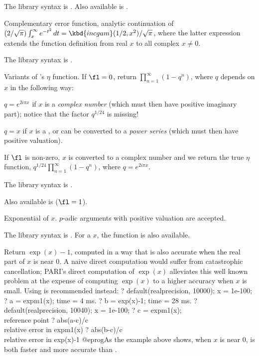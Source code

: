 The library syntax is .
Also available is .

\label{se:erfc}
Complementary error function, analytic continuation of
$(2/\sqrt\pi)\int_x^\infty e^{-t^2}\,dt = \kbd{incgam}(1/2,x^2)/\sqrt\pi$,
where the latter expression extends the function definition from real $x$ to
all complex $x \neq 0$.

The library syntax is .

\label{se:eta}
Variants of 's $\eta$ function.
If $\fl = 0$, return $\prod_{n=1}^\infty(1-q^n)$, where $q$ depends on $x$
in the following way:

\item $q = e^{2i\pi x}$ if $x$ is a \emph{complex number} (which must then
have positive imaginary part); notice that the factor $q^{1/24}$ is
missing!

\item $q = x$ if $x$ is a , or can be converted to a
\emph{power series} (which must then have positive valuation).

If $\fl$ is non-zero, $x$ is converted to a complex number and we return the
true $\eta$ function, $q^{1/24}\prod_{n=1}^\infty(1-q^n)$,
where $q = e^{2i\pi x}$.

The library syntax is .

Also available is  ($\fl=1$).

\label{se:exp}
Exponential of $x$.
$p$-adic arguments with positive valuation are accepted.

The library syntax is .
For a  $x$, the function
 is also available.

\label{se:expm1}
Return $\exp(x)-1$, computed in a way that is also accurate
when the real part of $x$ is near $0$.
A naive direct computation would suffer from catastrophic cancellation;
PARI's direct computation of $\exp(x)$ alleviates this well known problem at
the expense of computing $\exp(x)$ to a higher accuracy when $x$ is small.
Using  is recommended instead:
\bprog
? default(realprecision, 10000); x = 1e-100;
? a = expm1(x);
time = 4 ms.
? b = exp(x)-1;
time = 28 ms.
? default(realprecision, 10040); x = 1e-100;
? c = expm1(x);  \\ reference point
? abs(a-c)/c  \\ relative error in expm1(x)
? abs(b-c)/c  \\ relative error in exp(x)-1
@eprog\noindent As the example above shows, when $x$ is near $0$,
 is both faster and more accurate than .


